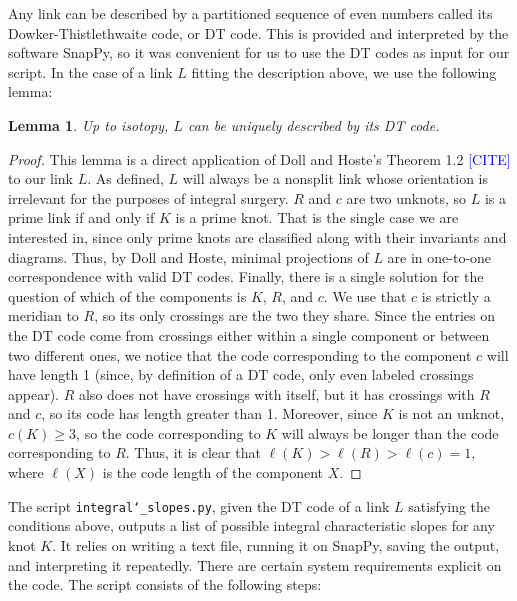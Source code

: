 \documentclass[11pt,usenames,dvipsnames,reqno]{amsart}
\numberwithin{theorem}{section}
\newtheorem{lemma}[theorem]{Lemma}
\theoremstyle{ex}
\theoremstyle{rem}
\def\kh#1{\textcolor{Blue}{#1}}
\begin{document}
Any link can be described by a partitioned sequence of even numbers called its Dowker-Thistlethwaite  code, or DT code. This is provided and interpreted by the software SnapPy, so it was convenient for us to use the DT codes as input for our script. In the case of a link $L$ fitting the description above, we use the following lemma:

\begin{lemma}
	Up to isotopy, $L$ can be uniquely described by its DT code.
\end{lemma}
\begin{proof}
	This lemma is a direct application of Doll and Hoste's Theorem 1.2 \kh{[CITE]} to our link $L$. As defined, $L$ will always be a nonsplit link whose orientation is irrelevant for the purposes of integral surgery. $R$ and $c$ are two unknots, so $L$ is a prime link if and only if $K$ is a prime knot. That is the single case we are interested in, since only prime knots are classified along with their invariants and diagrams. Thus, by Doll and Hoste, minimal projections of $L$ are in one-to-one correspondence with valid DT codes.
	Finally, there is a single solution for the question of which of the components is $K$, $R$, and $c$. We use that $c$ is strictly a meridian to $R$, so its only crossings are the two they share. Since the entries on the DT code come from crossings either within a single component or between two different ones, we notice that the code corresponding to the component $c$ will have length 1 (since, by definition of a DT code, only even labeled crossings appear). $R$ also does not have crossings with itself, but it has crossings with $R$ and $c$, so its code has length greater than 1. Moreover, since $K$ is not an unknot, $c(K) \geq 3$, so the code corresponding to $K$ will always be longer than the code corresponding to $R$. Thus, it is clear that $\ell(K) > \ell(R) > \ell(c) = 1$, where $\ell(X)$ is the code length of the component $X$.
\end{proof}

The script \texttt{integral\char`_slopes.py}, given the DT code of a link $L$ satisfying the conditions above, outputs a list of possible integral characteristic slopes for any knot $K$. It relies on writing a text file, running it on SnapPy, saving the output, and interpreting it repeatedly. There are certain system requirements explicit on the code. The script consists of the following steps:
\end{document}
